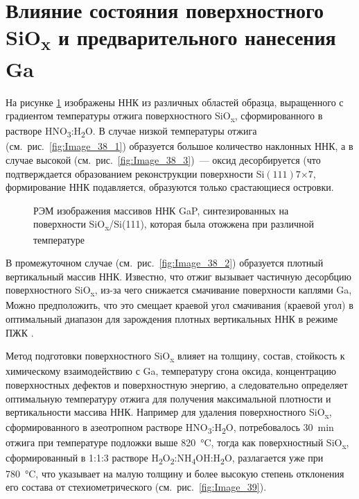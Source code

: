 \section{Влияние состояния поверхностного SiO\textsubscript{x} и
предварительного нанесения Ga}\label{sec:ch5/sec2}

На рисунке \cref{fig:Image_38} изображены ННК из различных областей образца,
выращенного с градиентом температуры отжига поверхностного
SiO\textsubscript{x}, сформированного в растворе
HNO\textsubscript{3}:H\textsubscript{2}O. В случае низкой температуры отжига
(см.~рис.~\cref{fig:Image_38_1}) образуется большое количество наклонных ННК, а
в случае высокой (см.~рис.~\cref{fig:Image_38_3})~--- оксид десорбируется (что
подтверждается образованием реконструкции поверхности
Si\((111)7\)\(\times\)\(7\), формирование ННК подавляется, образуются только
срастающиеся островки.

\begin{figure}[ht]  \caption{РЭМ
		изображения массивов ННК GaP, синтезированных на поверхности
		SiO\textsubscript{x}/Si(111), которая была отожжена при различной
температуре}\label{fig:Image_38} \end{figure}

В промежуточном случае (см.~рис.~\cref{fig:Image_38_2}) образуется плотный
вертикальный массив ННК. Известно, что отжиг вызывает частичную десорбцию
поверхностного SiO\textsubscript{x}, из-за чего снижается смачивание
поверхности каплями Ga, Можно предположить, что это смещает краевой угол
смачивания (краевой угол) в оптимальный диапазон для зарождения плотных
вертикальных ННК в режиме ПЖК \cite{Matteini2015}.

Метод подготовки поверхностного SiO\textsubscript{x} влияет на толщину, состав,
стойкость к химическому взаимодействию с Ga, температуру сгона оксида,
концентрацию поверхностных дефектов и поверхностную энергию, а следовательно
определяет оптимальную температуру отжига для получения максимальной плотности
и вертикальности массива ННК. Например для удаления поверхностного
SiO\textsubscript{x}, сформированного в азеотропном растворе
HNO\textsubscript{3}:H\textsubscript{2}O, потребовалось 30~\si{\minute} отжига
при температуре подложки выше 820~\si{\degreeCelsius}, тогда как поверхностный
SiO\textsubscript{x}, сформированный в 1:1:3 растворе
H\textsubscript{2}O\textsubscript{2}:NH\textsubscript{4}OH:H\textsubscript{2}O,
разлагается уже при 780~\si{\degreeCelsius}, что указывает на малую толщину и
более высокую степень отклонения его состава от стехиометрического
(см.~рис.~\cref{fig:Image_39}).

